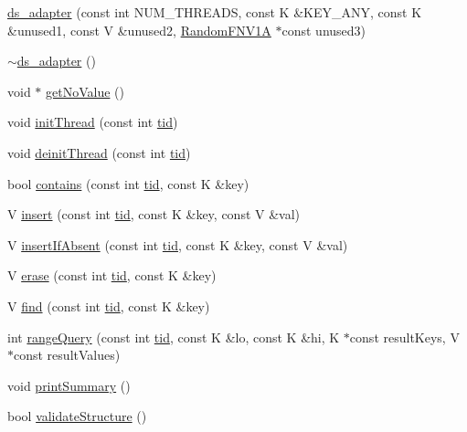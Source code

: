\begin{DoxyCompactItemize}
\hyperlink{classds__adapter_a553e7a145bf0cdfb14cb9dc25eec03d3}{ds\+\_\+adapter} (const int N\+U\+M\+\_\+\+T\+H\+R\+E\+A\+DS, const K \&K\+E\+Y\+\_\+\+A\+NY, const K \&unused1, const V \&unused2, \hyperlink{classRandomFNV1A}{Random\+F\+N\+V1A} $\ast$const unused3)
\item 
\hyperlink{classds__adapter_a366f46dd39d59f2d4a147589f5fd98e3}{$\sim$ds\+\_\+adapter} ()
\item 
void $\ast$ \hyperlink{classds__adapter_adb631e454b8146520f601d1a86c6c72c}{get\+No\+Value} ()
\item 
void \hyperlink{classds__adapter_a3733f6a6b57312b1b5e4fb5181d82a0b}{init\+Thread} (const int \hyperlink{microbench_2main_8cpp_a9ca9869868fe7e7a38a921cc7de4103f}{tid})
\item 
void \hyperlink{classds__adapter_a173ca48b19fc1dc346159ea582c690cd}{deinit\+Thread} (const int \hyperlink{microbench_2main_8cpp_a9ca9869868fe7e7a38a921cc7de4103f}{tid})
\item 
bool \hyperlink{classds__adapter_aecf1899dbe9fae93c72ee2b5549cf6eb}{contains} (const int \hyperlink{microbench_2main_8cpp_a9ca9869868fe7e7a38a921cc7de4103f}{tid}, const K \&key)
\item 
V \hyperlink{classds__adapter_a6c0fc676d77e30e14946baf325174739}{insert} (const int \hyperlink{microbench_2main_8cpp_a9ca9869868fe7e7a38a921cc7de4103f}{tid}, const K \&key, const V \&val)
\item 
V \hyperlink{classds__adapter_ae9cb29ad0c0338c0e1d12ef97e008135}{insert\+If\+Absent} (const int \hyperlink{microbench_2main_8cpp_a9ca9869868fe7e7a38a921cc7de4103f}{tid}, const K \&key, const V \&val)
\item 
V \hyperlink{classds__adapter_a1bf459e8449df93cc738a644aeffdcfb}{erase} (const int \hyperlink{microbench_2main_8cpp_a9ca9869868fe7e7a38a921cc7de4103f}{tid}, const K \&key)
\item 
V \hyperlink{classds__adapter_a0109b0d011810f687c9e9273eb1d1bc8}{find} (const int \hyperlink{microbench_2main_8cpp_a9ca9869868fe7e7a38a921cc7de4103f}{tid}, const K \&key)
\item 
int \hyperlink{classds__adapter_a23a9c8db5425e98a93d647df1c6c23dd}{range\+Query} (const int \hyperlink{microbench_2main_8cpp_a9ca9869868fe7e7a38a921cc7de4103f}{tid}, const K \&lo, const K \&hi, K $\ast$const result\+Keys, V $\ast$const result\+Values)
\item 
void \hyperlink{classds__adapter_aac97293215557665d2ef1e1a0d06fcfd}{print\+Summary} ()
\item 
bool \hyperlink{classds__adapter_ae50fe8a8683c0278cdd4c45e1405860d}{validate\+Structure} ()

\end{DoxyCompactItemize}
